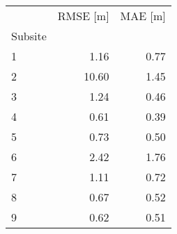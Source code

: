 \begin{tabular}{lrr}
\toprule
 & RMSE [m] & MAE [m] \\
Subsite &  &  \\
\midrule
1 & 1.16 & 0.77 \\
2 & 10.60 & 1.45 \\
3 & 1.24 & 0.46 \\
4 & 0.61 & 0.39 \\
5 & 0.73 & 0.50 \\
6 & 2.42 & 1.76 \\
7 & 1.11 & 0.72 \\
8 & 0.67 & 0.52 \\
9 & 0.62 & 0.51 \\
\bottomrule
\end{tabular}
